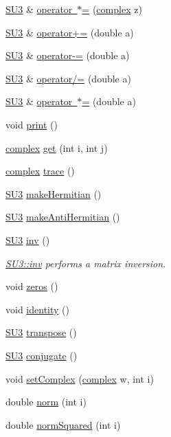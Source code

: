 \begin{DoxyCompactItemize}
\item 
\mbox{\hyperlink{class_s_u3}{S\+U3}} \& \mbox{\hyperlink{class_s_u3_ad1b4ea5706f0d1764c7a9516255a74e4}{operator $\ast$=}} (\mbox{\hyperlink{classcomplex}{complex}} z)
\item 
\mbox{\hyperlink{class_s_u3}{S\+U3}} \& \mbox{\hyperlink{class_s_u3_a66ffbe776e74e2c20040096ea6577037}{operator+=}} (double a)
\item 
\mbox{\hyperlink{class_s_u3}{S\+U3}} \& \mbox{\hyperlink{class_s_u3_aaa29d14e952a9b9fcacad15f4a34c6d6}{operator-\/=}} (double a)
\item 
\mbox{\hyperlink{class_s_u3}{S\+U3}} \& \mbox{\hyperlink{class_s_u3_a9b49b10ffea08d20b5a89409501ef7d5}{operator/=}} (double a)
\item 
\mbox{\hyperlink{class_s_u3}{S\+U3}} \& \mbox{\hyperlink{class_s_u3_aa339fae3b75bd58fac445d38c68582d7}{operator $\ast$=}} (double a)
\item 
void \mbox{\hyperlink{class_s_u3_a40d6e853cd73f87b4113e22a53d45e89}{print}} ()
\item 
\mbox{\hyperlink{classcomplex}{complex}} \mbox{\hyperlink{class_s_u3_aa0c34df7c067dcbb917d18cf587046a2}{get}} (int i, int j)
\item 
\mbox{\hyperlink{classcomplex}{complex}} \mbox{\hyperlink{class_s_u3_ac1c6438d29178aa1255ee4f2f48d2430}{trace}} ()
\item 
\mbox{\hyperlink{class_s_u3}{S\+U3}} \mbox{\hyperlink{class_s_u3_a7035a3e94f6dd27ece144b42473cade9}{make\+Hermitian}} ()
\item 
\mbox{\hyperlink{class_s_u3}{S\+U3}} \mbox{\hyperlink{class_s_u3_a25e7cd46d60f25138585b76115e791a3}{make\+Anti\+Hermitian}} ()
\item 
\mbox{\hyperlink{class_s_u3}{S\+U3}} \mbox{\hyperlink{class_s_u3_ad0e19706d3c6fdb50dcf788d4b48eb4c}{inv}} ()
\begin{DoxyCompactList}\small\item\em \mbox{\hyperlink{class_s_u3_ad0e19706d3c6fdb50dcf788d4b48eb4c}{S\+U3\+::inv}} performs a matrix inversion. \end{DoxyCompactList}\item 
void \mbox{\hyperlink{class_s_u3_a9f3527fd882882ddfa18d72f5f43176c}{zeros}} ()
\item 
void \mbox{\hyperlink{class_s_u3_af84aef1d34a4fdcda292200804eb1221}{identity}} ()
\item 
\mbox{\hyperlink{class_s_u3}{S\+U3}} \mbox{\hyperlink{class_s_u3_af0229a4940c6c4355a2994ccaa663d0e}{transpose}} ()
\item 
\mbox{\hyperlink{class_s_u3}{S\+U3}} \mbox{\hyperlink{class_s_u3_a1db359a1ede38fcf858876292a8c9c43}{conjugate}} ()
\item 
void \mbox{\hyperlink{class_s_u3_a794ecde931082d02f625cab14d0e83e3}{set\+Complex}} (\mbox{\hyperlink{classcomplex}{complex}} w, int i)
\item 
double \mbox{\hyperlink{class_s_u3_a1f0faef4a7cf1a1a3e6ec525cef55561}{norm}} (int i)
\item 
double \mbox{\hyperlink{class_s_u3_a7926e38b8705e0f5c3eaf7d0361f3543}{norm\+Squared}} (int i)
\end{DoxyCompactItemize}
